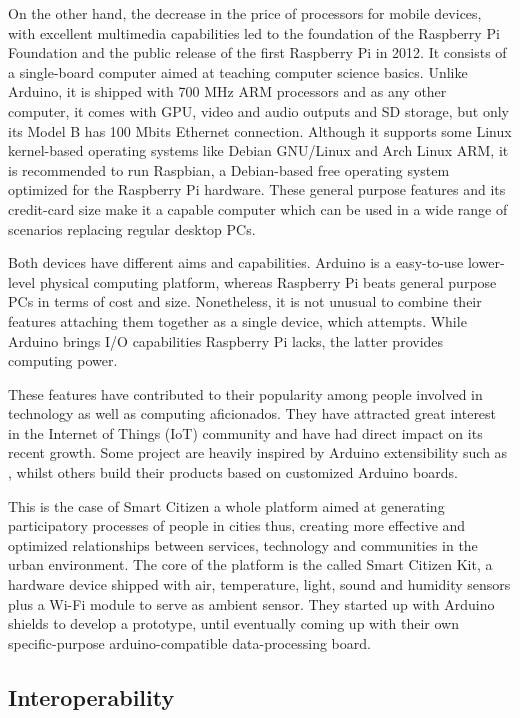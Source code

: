 On the other hand, the decrease in the price of processors for mobile devices, with excellent multimedia capabilities led to the foundation of the Raspberry Pi Foundation and the public release of the first Raspberry Pi in 2012. It consists of a single-board computer aimed at teaching computer science basics. Unlike Arduino, it is shipped with 700 MHz ARM processors and as any other computer, it comes with GPU, video and audio outputs and SD storage, but only its Model B has 100 Mbits Ethernet connection. Although it supports some Linux kernel-based operating systems like Debian GNU/Linux and Arch Linux ARM, it is recommended to run Raspbian, a Debian-based free operating system optimized for the Raspberry Pi hardware. These general purpose features and its credit-card size make it a capable computer which can be used in a wide range of scenarios replacing regular desktop PCs.

Both devices have different aims and capabilities. Arduino is a easy-to-use lower-level physical computing platform, whereas Raspberry Pi beats general purpose PCs in terms of cost and size. Nonetheless, it is not unusual to combine their features attaching them together as a single device, which \cite{Arduberry} attempts. While Arduino brings I/O capabilities Raspberry Pi lacks, the latter provides computing power.

These features have contributed to their popularity among people involved in technology as well as computing aficionados. They have attracted great interest in the Internet of Things (IoT) community and have had direct impact on its recent growth. Some project are heavily inspired by Arduino extensibility such as \cite{Thinking-Things}, whilst others build their products based on customized Arduino boards.

This is the case of Smart Citizen a whole platform aimed at generating participatory processes of people in cities thus, creating more effective and optimized relationships between services, technology and communities in the urban environment. The core of the platform is the called Smart Citizen Kit, a hardware device shipped with air, temperature, light, sound and humidity sensors plus a Wi-Fi module to serve as ambient sensor. They started up with Arduino shields to develop a prototype, until eventually coming up with their own specific-purpose arduino-compatible data-processing board.

\subsection{Interoperability} \label{interoperability}

